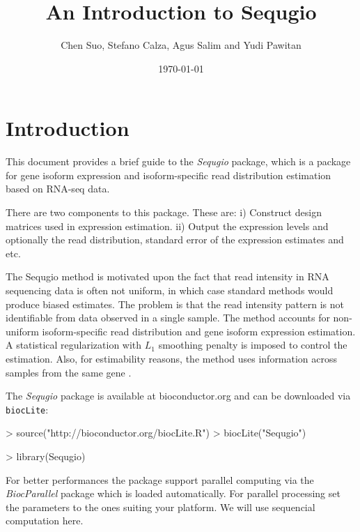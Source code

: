 \documentclass[10pt]{article}
\title{An Introduction to Sequgio}
\author{Chen Suo, Stefano Calza, Agus Salim and Yudi Pawitan}
\date{\today}
\newcommand{\Rfunction}[1]{{\texttt{#1}}}
\newcommand{\Rpackage}[1]{{\textit{#1}}}
\newcommand{\Sequgio}{\Rpackage{Sequgio}}
\begin{document}
\maketitle


\tableofcontents

\section{Introduction}

This document provides a brief guide to the \Sequgio{} package, which is a
package for gene isoform expression and isoform-specific read distribution
estimation based on RNA-seq data.

There are two components to this package. These are: i) Construct design
matrices used in expression estimation.  ii) Output the expression levels and
optionally the read distribution, standard error of the expression estimates and
etc.

The Sequgio method is motivated upon the fact that read intensity in RNA
sequencing data is often not uniform, in which case standard methods would
produce biased estimates. The problem is that the read intensity pattern is not
identifiable from data observed in a single sample. The method accounts for
non-uniform isoform-specific read distribution and gene isoform expression
estimation. A statistical regularization with $L_1$ smoothing penalty is imposed
to control the estimation. Also, for estimability reasons, the method uses
information across samples from the same gene \cite{SC}.

The \Sequgio{} package is available at bioconductor.org
and can be downloaded via \Rfunction{biocLite}:

\begin{Schunk}
\begin{Sinput}
> source("http://bioconductor.org/biocLite.R")
> biocLite("Sequgio")
\end{Sinput}
\end{Schunk}

\begin{Schunk}
\begin{Sinput}
> library(Sequgio)
\end{Sinput}
\end{Schunk}


For better performances the package support parallel computing via the
\Rpackage{BiocParallel} package which is loaded automatically. For parallel
processing set the parameters to the ones suiting your platform. We will use
sequencial computation here.
\end{document}
